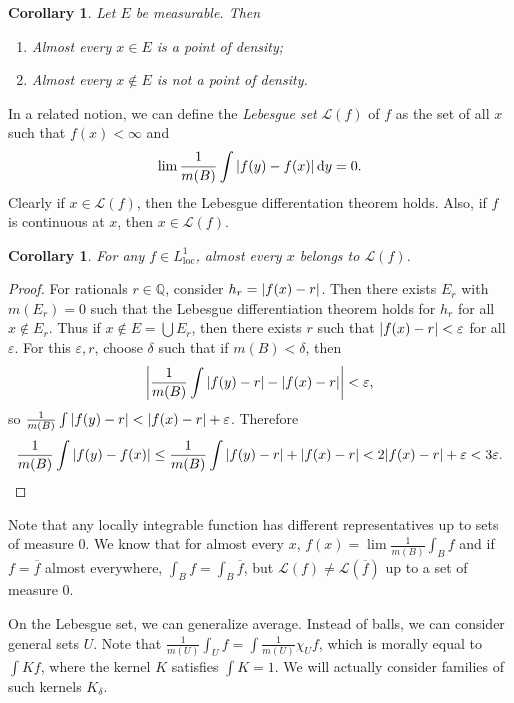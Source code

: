 \documentclass[leqno, openany]{memoir}
\newtheorem{cor}[thm]{Corollary}
\theoremstyle{definition}
\theoremstyle{remark}
\theoremstyle{plain}
\theoremstyle{definition}
\theoremstyle{remark}
\newcommand{\Q}{\mathbb{Q}}
\newcommand{\ep}{\varepsilon}
\newcommand{\mc}[1]{\mathcal{#1}}
\newcommand{\mr}[1]{\mathrm{#1}}
\newcommand{\ol}[1]{\overline{#1}}
\begin{document}
\begin{cor}
    Let $E$ be measurable. Then 
    \begin{enumerate}
        \item Almost every $x \in E$ is a point of density;
        \item Almost every $x \notin E$ is not a point of density.
    \end{enumerate}
\end{cor}

In a related notion, we can define the \textit{Lebesgue set} $\mc{L}(f)$ of $f$ as the set of all $x$ such that $f(x) < \infty$ and
\[ \lim \frac{1}{m(B)} \int \abs{f(y) - f(x)} \dd{y} = 0. \]
Clearly if $x \in \mc{L}(f)$, then the Lebesgue differentation theorem holds. Also, if $f$ is continuous at $x$, then $x \in \mc{L}(f)$.

\begin{cor}
    For any $f \in L^1_{\mr{loc}}$, almost every $x$ belongs to $\mc{L}(f)$.
\end{cor}

\begin{proof}
    For rationals $r \in \Q$, consider $h_r = \abs{f(x) - r}$. Then there exists $E_r$ with $m(E_r) = 0$ such that the Lebesgue differentiation theorem holds for $h_r$ for all $x \notin E_r$. Thus if $x \notin E = \bigcup E_r$, then there exists $r$ such that $\abs{f(x) - r} < \ep$ for all $\ep$. For this $\ep, r$, choose $\delta$ such that if $m(B) < \delta$, then 
    \[ \abs{\frac{1}{m(B)} \int \abs{f(y) - r} - \abs{f(x) - r}} < \ep, \]
    so $\frac{1}{m(B)} \int \abs{f(y) - r} < \abs{f(x) - r} + \ep$. Therefore
    \[ \frac{1}{m(B)} \int \abs{f(y) - f(x)} \leq \frac{1}{m(B)} \int \abs{f(y) - r} + \abs{f(x) - r} < 2 \abs{f(x) - r} + \ep < 3 \ep. \qedhere \]
\end{proof}

Note that any locally integrable function has different representatives up to sets of measure $0$. We know that for almost every $x$, $f(x) = \lim \frac{1}{m(B)} \int_B f$ and if $f = \ol{f}$ almost everywhere, $\int_B f = \int_B \ol{f}$, but $\mc{L}(f) \neq \mc{L}(\ol{f})$ up to a set of measure $0$.

On the Lebesgue set, we can generalize average. Instead of balls, we can consider general sets $U$. Note that $\frac{1}{m(U)} \int_U f = \int \frac{1}{m(U)} \chi_U f$, which is morally equal to $\int Kf$, where the kernel $K$ satisfies $\int K = 1$. We will actually consider families of such kernels $K_{\delta}$.
\end{document}
